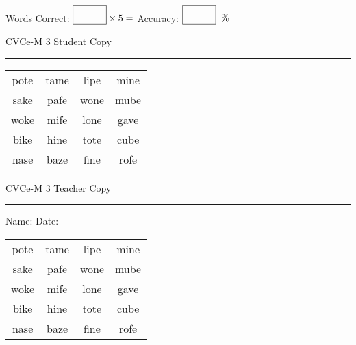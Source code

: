 \documentclass{memoir}
\begin{document}
\small

Words Correct: $\fbox{\phantom{\huge 100}} \times 5 = $ Accuracy: $\fbox{\phantom{\huge 100}}\;\; \%$ 

\vfill

\newpage


\footnotesize \noindent
CVCe-M 3 \hfill Student Copy
\smallskip
\hrule

\Large

\setlength{\tabcolsep}{14pt}
\def\arraystretch{2}

{\selectfont


\begin{vplace}[0.5]
\begin{center}
\begin{tabular}{cccc}
pote & tame & lipe & mine \\
sake & pafe & wone & mube \\
woke & mife & lone & gave \\
bike & hine & tote & cube \\
nase & baze & fine & rofe \\
\end{tabular}
\end{center}
\end{vplace}

}

\newpage

\footnotesize \noindent
CVCe-M 3 \hfill Teacher Copy
\smallskip
\hrule

\small

\vfill

\noindent
Name: \underline{\hspace{1.75in}} \hfill Date: \underline{\hspace{1in}}

\Large

{\selectfont


\begin{vplace}[0.5]
\begin{center}
\begin{tabular}{cccc}
pote & tame & lipe & mine \\
sake & pafe & wone & mube \\
woke & mife & lone & gave \\
bike & hine & tote & cube \\
nase & baze & fine & rofe \\
\end{tabular}
\end{center}
\end{vplace}



}
\end{document}
